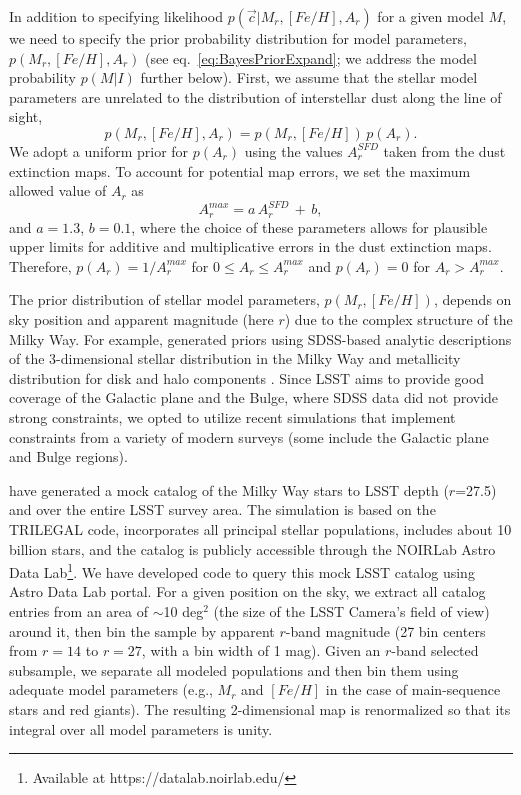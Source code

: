 In addition to specifying likelihood $p(\vec{c}|M_r, [Fe/H], A_r)$ for a given model $M$, we need to specify
the prior probability distribution for model parameters, $p(M_r, [Fe/H],A_r)$ (see eq.~\ref{eq:BayesPriorExpand};
we address the model probability $p(M|I)$ further below). First, we assume that the stellar model parameters
are unrelated to the distribution of interstellar dust along the line of sight,
\begin{equation}
 \label{eq:BayesPrior2}
               p(M_r, [Fe/H],A_r) = p(M_r, [Fe/H]) \, p(A_r).
\end{equation}
We adopt a uniform prior for $p(A_r)$ using the values $A_r^{SFD}$ taken from the \cite{schlegel_maps_1998}
dust extinction maps. To account for potential map errors, we set the maximum allowed value of $A_r$ as
\begin{equation}
          A_r^{max} =  a \, A_r^{SFD} \, + \, b,
\end{equation}
and $a=1.3$, $b=0.1$, where the choice of these parameters allows for plausible upper limits for additive and
multiplicative errors in the dust extinction maps. Therefore, $p(A_r) = 1/A_r^{max}$ for $0 \le A_r \le A_r^{max}$
and $p(A_r) = 0$ for $A_r > A_r^{max}$.  

The prior distribution of stellar model parameters, $p(M_r, [Fe/H])$, depends on sky position and apparent
magnitude (here $r$) due to the complex structure of the Milky Way. For example,  \cite{2014ApJ...783..114G}
generated priors using SDSS-based analytic descriptions of the 3-dimensional stellar distribution in the Milky Way
\citep{2008ApJ...673..864J} and metallicity distribution for disk and halo components \citep{2008ApJ...684..287I}. 
Since LSST aims to provide good coverage of the Galactic plane and the Bulge, where SDSS data did not provide strong
constraints, we opted to utilize recent simulations that implement constraints from a variety of modern surveys (some
include the Galactic plane and Bulge regions). 

\cite{dal_tio_simulating_2022} have generated a mock catalog of the Milky Way stars to LSST depth ($r$=27.5) and over
the entire LSST survey area. The simulation is based on the TRILEGAL code, incorporates all principal stellar populations,
includes about 10 billion stars, and the catalog is publicly accessible through the NOIRLab Astro Data
Lab\footnote{Available at https://datalab.noirlab.edu/}.
We have developed code to query this mock LSST catalog using Astro Data Lab portal. For a given position on the sky, we
extract all catalog entries from an area of $\sim$10 deg$^2$ (the size of the LSST Camera's field of view) around it, then bin
the sample by apparent $r$-band magnitude (27 bin centers from $r=14$ to $r=27$, with a bin width of 1 mag). 
Given an $r$-band selected subsample, we separate all modeled populations and then bin them using adequate model
parameters (e.g., $M_r$ and $[Fe/H]$ in the case of main-sequence stars and red giants). The resulting 2-dimensional map
is renormalized so that its integral over all model parameters is unity.

